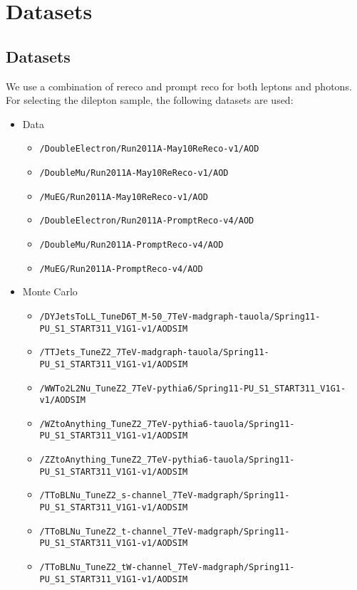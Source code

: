 
\section{Datasets}
\label{sec:datasets}

\subsection{Datasets}

We use a combination of rereco and prompt reco for both leptons and photons.
\\
For selecting the dilepton sample, the following datasets are used:


\begin{itemize}
\item Data 
\begin{itemize}
\item \verb=/DoubleElectron/Run2011A-May10ReReco-v1/AOD=
\item \verb=/DoubleMu/Run2011A-May10ReReco-v1/AOD=
\item \verb=/MuEG/Run2011A-May10ReReco-v1/AOD=
\item \verb=/DoubleElectron/Run2011A-PromptReco-v4/AOD=
\item \verb=/DoubleMu/Run2011A-PromptReco-v4/AOD=
\item \verb=/MuEG/Run2011A-PromptReco-v4/AOD=
\end{itemize}

\item Monte Carlo
\begin{itemize} 
\item \verb=/DYJetsToLL_TuneD6T_M-50_7TeV-madgraph-tauola/Spring11-PU_S1_START311_V1G1-v1/AODSIM=
\item \verb=/TTJets_TuneZ2_7TeV-madgraph-tauola/Spring11-PU_S1_START311_V1G1-v1/AODSIM=
\item \verb=/WWTo2L2Nu_TuneZ2_7TeV-pythia6/Spring11-PU_S1_START311_V1G1-v1/AODSIM=
\item \verb=/WZtoAnything_TuneZ2_7TeV-pythia6-tauola/Spring11-PU_S1_START311_V1G1-v1/AODSIM=
\item \verb=/ZZtoAnything_TuneZ2_7TeV-pythia6-tauola/Spring11-PU_S1_START311_V1G1-v1/AODSIM=
\item \verb=/TToBLNu_TuneZ2_s-channel_7TeV-madgraph/Spring11-PU_S1_START311_V1G1-v1/AODSIM=
\item \verb=/TToBLNu_TuneZ2_t-channel_7TeV-madgraph/Spring11-PU_S1_START311_V1G1-v1/AODSIM=
\item \verb=/TToBLNu_TuneZ2_tW-channel_7TeV-madgraph/Spring11-PU_S1_START311_V1G1-v1/AODSIM=
\end{itemize}
\end{itemize}

